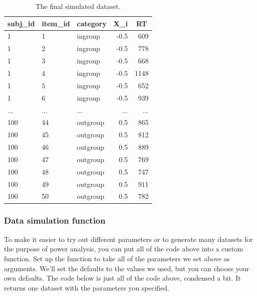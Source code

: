 \documentclass[
  english,
  doc,floatsintext]{apa6}
\begin{document}
\begin{table}[H]

\begin{center}
\begin{threeparttable}

\caption{\label{tab:dat-sim-table}The final simulated dataset.}

\begin{tabular}{lllrr}
\toprule
subj\_id & \multicolumn{1}{c}{item\_id} & \multicolumn{1}{c}{category} & \multicolumn{1}{c}{X\_i} & \multicolumn{1}{c}{RT}\\
\midrule
1 & 1 & ingroup & -0.5 & 609\\
1 & 2 & ingroup & -0.5 & 778\\
1 & 3 & ingroup & -0.5 & 668\\
1 & 4 & ingroup & -0.5 & 1148\\
1 & 5 & ingroup & -0.5 & 652\\
1 & 6 & ingroup & -0.5 & 939\\
... & ... & ... & ... & ...\\
100 & 44 & outgroup & 0.5 & 865\\
100 & 45 & outgroup & 0.5 & 812\\
100 & 46 & outgroup & 0.5 & 889\\
100 & 47 & outgroup & 0.5 & 769\\
100 & 48 & outgroup & 0.5 & 747\\
100 & 49 & outgroup & 0.5 & 911\\
100 & 50 & outgroup & 0.5 & 782\\
\bottomrule
\end{tabular}

\end{threeparttable}
\end{center}

\end{table}

\hypertarget{data-simulation-function}{%
\subsubsection{Data simulation function}\label{data-simulation-function}}

To make it easier to try out different parameters or to generate many datasets for the purpose of power analysis, you can put all of the code above into a custom function. Set up the function to take all of the parameters we set above as arguments. We'll set the defaults to the values we used, but you can choose your own defaults. The code below is just all of the code above, condensed a bit. It returns one dataset with the parameters you specified.
\end{document}
